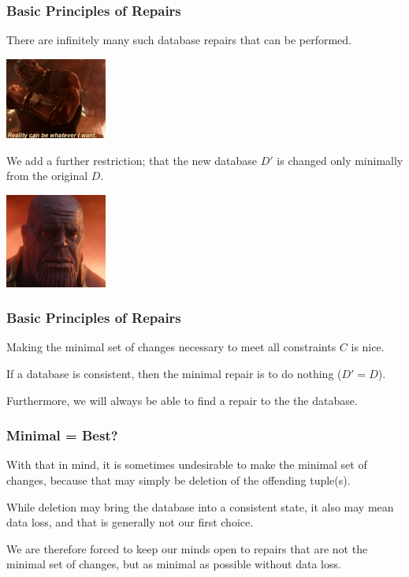 \begin{frame}
\frametitle{Basic Principles of Repairs}

There are infinitely many such database repairs that can be performed. 

\begin{center}
	\includegraphics[width=0.25\textwidth]{images/thanos1.jpeg}
\end{center}

We add a further restriction; that the new database $D'$ is changed only minimally from the original $D$.

\begin{center}
	\includegraphics[width=0.25\textwidth]{images/thanos2.jpg}
\end{center}

\end{frame}

\begin{frame}
\frametitle{Basic Principles of Repairs}
Making the minimal set of changes necessary to meet all constraints $C$ is nice.


If a database is consistent, then the minimal repair is to do nothing ($D' = D$). 

Furthermore, we will always be able to find a repair to the the database.

\end{frame}

\begin{frame}
\frametitle{Minimal = Best?}

With that in mind, it is sometimes undesirable to make the minimal set of changes, because that may simply be deletion of the offending tuple(s). 

While deletion may bring the database into a consistent state, it also may mean data loss, and that is generally not our first choice. 

We are therefore forced to keep our minds open to repairs that are not the minimal set of changes, but as minimal as possible without data loss.


\end{frame}


